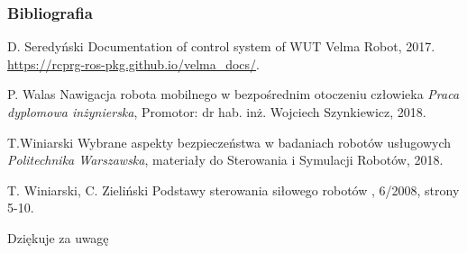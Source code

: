 
\begin{frame}[plain]
\addtocounter{framenumber}{-1}
\frametitle{Bibliografia}
\footnotesize{
\begin{thebibliography}{99} %
 D. Seredyński
\newblock Documentation of control system of WUT Velma Robot, 2017.
\newblock \url{https://rcprg-ros-pkg.github.io/velma\_docs/}.

 P. Walas
\newblock Nawigacja robota mobilnego w bezpośrednim otoczeniu człowieka
\newblock \emph{Praca dyplomowa inżynierska}, Promotor: dr hab. inż. Wojciech Szynkiewicz, 2018.

 T.Winiarski
\newblock Wybrane aspekty bezpieczeństwa w badaniach robotów usługowych
\newblock \emph{Politechnika Warszawska}, materiały do Sterowania i Symulacji Robotów, 2018.

 T. Winiarski, C. Zieliński
\newblock Podstawy sterowania siłowego robotów
, 6/2008, strony 5-10.

\end{thebibliography}
}
\end{frame}


\begin{frame}[plain]
\addtocounter{framenumber}{-1}
\Huge{\centerline{Dziękuje za uwagę}}
\end{frame}
